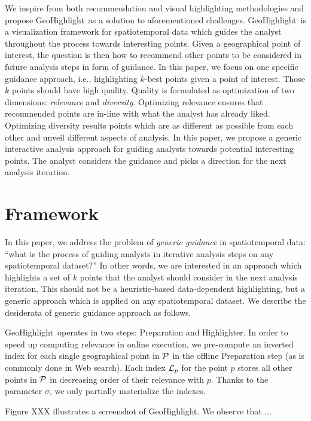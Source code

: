 \documentclass[conference]{IEEEtran}
\newcommand{\sys}{{\sc GeoHighlight}}
\newcommand{\framework}{{\sc GeoHighlight}}
\begin{document}
We inspire from both recommendation \cite{Omidvar-Tehrani:2015} and visual highlighting \cite{Liang2010,Robinson2011} methodologies and propose \sys\ as a solution to aforementioned challenges. \sys\ is a visualization framework for spatiotemporal data which guides the analyst throughout the process towards interesting points. Given a geographical point of interest, the question is then how to recommend other points to be considered in future analysis steps in form of guidance. In this paper, we focus on one specific guidance approach, i.e., highlighting $k$-best points given a point of interest. Those $k$ points should have high quality. Quality is formulated as optimization of two dimensions: {\em relevance} and {\em diversity}. Optimizing relevance ensures that recommended points are in-line with what the analyst has already liked. Optimizing diversity results points which are as different as possible from each other and unveil different aspects of analysis. In this paper, we propose a generic interactive analysis approach for guiding analysts towards potential interesting points. The analyst considers the guidance and picks a direction for the next analysis iteration.

\vspace{-5pt}
\section{Framework}
In this paper, we address the problem of {\em generic guidance} in spatiotemporal data: ``what is the process of guiding analysts in iterative analysis steps on any spatiotemporal dataset?'' In other words, we are interested in an approach which highlights a set of $k$ points that the analyst should consider in the next analysis iteration. This should not be a heuristic-based data-dependent highlighting, but a generic approach which is applied on any spatiotemporal dataset. We describe the desiderata of generic guidance approach as follows.

\framework\ operates in two steps: {\sc Preparation} and {\sc Highlighter}. In order to speed up computing relevance in online execution, we pre-compute an inverted index for each single geographical point in ${\cal P}$ in the offline {\sc Preparation} step (as is commonly done in Web search). Each index ${\cal L}_p$ for the point $p$ stores all other points in ${\cal P}$ in decreasing order of their relevance with $p$. Thanks to the parameter $\sigma$, we only partially materialize the indexes.

Figure XXX illustrates a screenshot of \sys. We observe that ...
\end{document}

